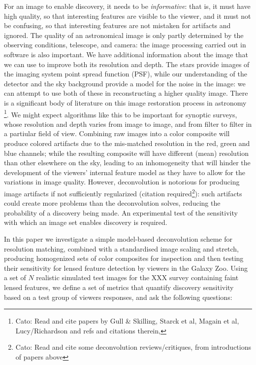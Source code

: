 \documentclass[letterpaper, 11pt]{article}
\begin{document}
For an image to enable discovery, it needs to be {\it informative}: that is,
it must have high quality, so that interesting features are visible to the
viewer, and it must not be confusing, so that interesting features are not
mistaken for artifacts and ignored. The quality of an astronomical image is
only partly determined by the observing conditions, telescope, and camera: the
image processing carried out in software is also important. We have additional
information about the image that we can use to improve both its resolution and
depth. The stars provide images of the imaging system point spread function
(PSF), while our understanding of the detector and the sky background provide
a model for the noise in the image: we can attempt to use both of these in
reconstructing a higher quality image. There is a significant body of
literature on this image restoration process in astronomy \citep[e.g.][]{MCS98}\footnote{Cato: Read and cite papers by Gull \& Skilling, Starck et
al, Magain et al, Lucy/Richardson and refs and citations therein\newline \cite{N+N82, S+B84, P+P94}, }. We might
expect algorithms like this to be important for synoptic surveys, whose
resolution and depth varies from image to image, and from filter to filter in
a partiular field of view. Combining raw images into a color composite will
produce colored artifacts due to the mis-matched resolution in the red, green
and blue channels; while the resulting composite will have different (mean)
resolution than other elsewhere on the sky, leading to an inhomogeneity that
will hinder the development of the viewers' internal feature model as they
have to allow for the variations in image quality. However, deconvolution is
notorious for producing image artifacts if not sufficiently regularized
(citation required\footnote{Cato: Read and cite some deconvolution
reviews/critiques, from introductions of papers above}): such artifacts could
create more problems than the deconvolution solves, reducing the probability
of a discovery being made.  An experimental test of the sensitivity with which
an image set enables discovery is required.

In this paper we investigate a simple model-based deconvolution scheme for
resolution matching, combined with a standardised image scaling and stretch,
producing homogenized sets of color composites for inspection and then testing
their sensitivity for lensed feature detection by viewers in the Galaxy Zoo.
Using a set of $N$ realistic simulated test images for the XXX survey 
containing faint lensed features, we define a set of metrics that quantify
discovery sensitivity based on a test group of viewers responses, and 
ask the following questions:
\end{document}
